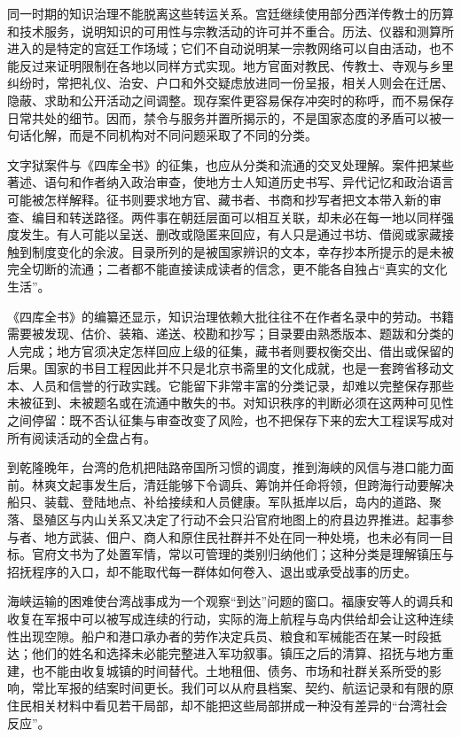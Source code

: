 同一时期的知识治理不能脱离这些转运关系。宫廷继续使用部分西洋传教士的历算和技术服务，说明知识的可用性与宗教活动的许可并不重合。历法、仪器和测算所进入的是特定的宫廷工作场域；它们不自动说明某一宗教网络可以自由活动，也不能反过来证明限制在各地以同样方式实现。地方官面对教民、传教士、寺观与乡里纠纷时，常把礼仪、治安、户口和外交疑虑放进同一份呈报，相关人则会在迁居、隐蔽、求助和公开活动之间调整。现存案件更容易保存冲突时的称呼，而不易保存日常共处的细节。因而，禁令与服务并置所揭示的，不是国家态度的矛盾可以被一句话化解，而是不同机构对不同问题采取了不同的分类。

文字狱案件与《四库全书》的征集，也应从分类和流通的交叉处理解。案件把某些著述、语句和作者纳入政治审查，使地方士人知道历史书写、异代记忆和政治语言可能被怎样解释。征书则要求地方官、藏书者、书商和抄写者把文本带入新的审查、编目和转送路径。两件事在朝廷层面可以相互关联，却未必在每一地以同样强度发生。有人可能以呈送、删改或隐匿来回应，有人只是通过书坊、借阅或家藏接触到制度变化的余波。目录所列的是被国家辨识的文本，幸存抄本所提示的是未被完全切断的流通；二者都不能直接读成读者的信念，更不能各自独占“真实的文化生活”。

《四库全书》的编纂还显示，知识治理依赖大批往往不在作者名录中的劳动。书籍需要被发现、估价、装箱、递送、校勘和抄写；目录要由熟悉版本、题跋和分类的人完成；地方官须决定怎样回应上级的征集，藏书者则要权衡交出、借出或保留的后果。国家的书目工程因此并不只是北京书斋里的文化成就，也是一套跨省移动文本、人员和信誉的行政实践。它能留下非常丰富的分类记录，却难以完整保存那些未被征到、未被题名或在流通中散失的书。对知识秩序的判断必须在这两种可见性之间停留：既不否认征集与审查改变了风险，也不把保存下来的宏大工程误写成对所有阅读活动的全盘占有。

到乾隆晚年，台湾的危机把陆路帝国所习惯的调度，推到海峡的风信与港口能力面前。林爽文起事发生后，清廷能够下令调兵、筹饷并任命将领，但跨海行动要解决船只、装载、登陆地点、补给接续和人员健康。军队抵岸以后，岛内的道路、聚落、垦殖区与内山关系又决定了行动不会只沿官府地图上的府县边界推进。起事参与者、地方武装、佃户、商人和原住民社群并不处在同一种处境，也未必有同一目标。官府文书为了处置军情，常以可管理的类别归纳他们；这种分类是理解镇压与招抚程序的入口，却不能取代每一群体如何卷入、退出或承受战事的历史。

海峡运输的困难使台湾战事成为一个观察“到达”问题的窗口。福康安等人的调兵和收复在军报中可以被写成连续的行动，实际的海上航程与岛内供给却会让这种连续性出现空隙。船户和港口承办者的劳作决定兵员、粮食和军械能否在某一时段抵达；他们的姓名和选择未必能完整进入军功叙事。镇压之后的清算、招抚与地方重建，也不能由收复城镇的时间替代。土地租佃、债务、市场和社群关系所受的影响，常比军报的结案时间更长。我们可以从府县档案、契约、航运记录和有限的原住民相关材料中看见若干局部，却不能把这些局部拼成一种没有差异的“台湾社会反应”。

